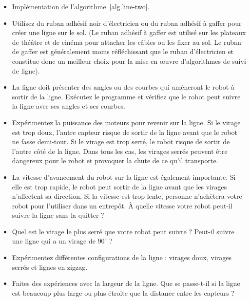 \begin{framed}
\begin{itemize}
\item Implémentation de l'algorithme~\ref{alg.line-two}.
\item Utilisez du ruban adhésif noir d'électricien ou du ruban adhésif à gaffer pour créer une ligne sur le sol. (Le ruban adhésif à gaffer est utilisé sur les plateaux de théâtre et de cinéma pour attacher les câbles ou les fixer au sol. Le ruban de gaffer est généralement moins réfléchissant que le ruban d'électricien et constitue donc un meilleur choix pour la mise en œuvre d'algorithmes de suivi de ligne).
\item La ligne doit présenter des angles ou des courbes qui amèneront le robot à sortir de la ligne. Exécutez le programme et vérifiez que le robot peut suivre la ligne avec ses angles et ses courbes.
\item Expérimentez la puissance des moteurs pour revenir sur la ligne. Si le virage est trop doux, l'autre capteur risque de sortir de la ligne avant que le robot ne fasse demi-tour. Si le virage est trop serré, le robot risque de sortir de l'autre côté de la ligne. Dans tous les cas, les virages serrés peuvent être dangereux pour le robot et provoquer la chute de ce qu'il transporte.
\item La vitesse d'avancement du robot sur la ligne est également importante. Si elle est trop rapide, le robot peut sortir de la ligne avant que les virages n'affectent sa direction. Si la vitesse est trop lente, personne n'achètera votre robot pour l'utiliser dans un entrepôt. À quelle vitesse votre robot peut-il suivre la ligne sans la quitter ?
\end{itemize}
\end{framed}

\begin{framed}
\begin{itemize}
\item Quel est le virage le plus serré que votre robot peut suivre ? Peut-il suivre une ligne qui a un virage de $90^\circ$ ?
\item Expérimentez différentes configurations de la ligne : virages doux, virages serrés et lignes en zigzag.
\item Faites des expériences avec la largeur de la ligne. Que se passe-t-il si la ligne est beaucoup plus large ou plus étroite que la distance entre les capteurs ?
\end{itemize}
\end{framed}

